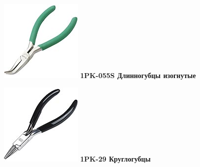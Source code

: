 {\begin{multicols}{2}
\noindent\includegraphics[width=\columnwidth]{00/fig/pros/1PK-055S.jpg}
\textbf{1PK-055S Длинногубцы изогнутые}

\noindent\includegraphics[width=\columnwidth]{00/fig/pros/1PK-29.jpg}
\textbf{1PK-29 Круглогубцы}


\end{multicols}}
